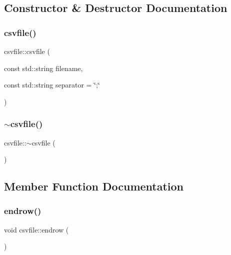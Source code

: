 \subsection{Constructor \& Destructor Documentation}
\mbox{\label{classcsvfile_a22aee506583f5fd125a8f8f3dcccff3b}} 
\subsubsection{\texorpdfstring{csvfile()}{csvfile()}}
{\footnotesize\ttfamily csvfile\+::csvfile (\begin{DoxyParamCaption}\item[{const std\+::string}]{filename,  }\item[{const std\+::string}]{separator = {\ttfamily \char`\"{};\char`\"{}} }\end{DoxyParamCaption})\hspace{0.3cm}{\ttfamily [inline]}}

\mbox{\label{classcsvfile_ac4a1a4a15b040e0afd25978dc07c2954}} 
\subsubsection{\texorpdfstring{$\sim$csvfile()}{~csvfile()}}
{\footnotesize\ttfamily csvfile\+::$\sim$csvfile (\begin{DoxyParamCaption}{ }\end{DoxyParamCaption})\hspace{0.3cm}{\ttfamily [inline]}}



\subsection{Member Function Documentation}
\mbox{\label{classcsvfile_afd878cbd74e1be9aa7e33bdf7f70e9ef}} 
\subsubsection{\texorpdfstring{endrow()}{endrow()}}
{\footnotesize\ttfamily void csvfile\+::endrow (\begin{DoxyParamCaption}{ }\end{DoxyParamCaption})\hspace{0.3cm}{\ttfamily [inline]}}

